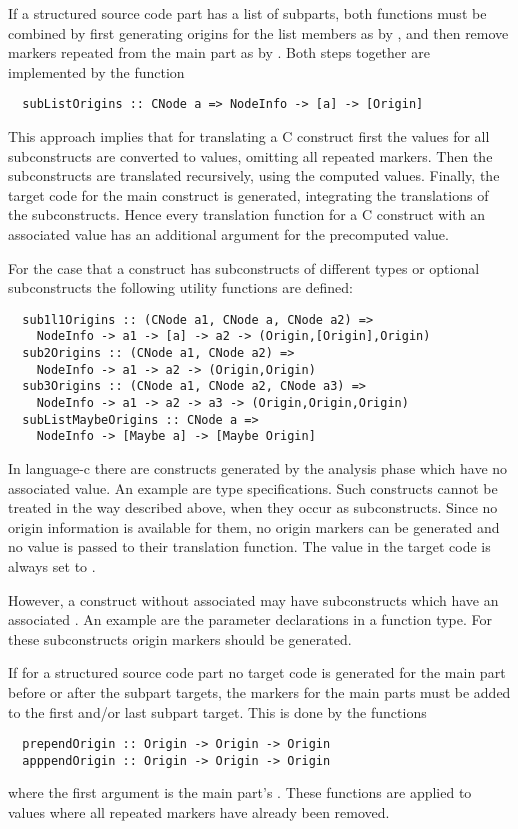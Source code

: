 If a structured source code part has a list of subparts, both functions must be combined by first generating origins 
for the list members as by , and then remove markers repeated from the main part as by .
Both steps together are implemented by the function
\begin{verbatim}
  subListOrigins :: CNode a => NodeInfo -> [a] -> [Origin]
\end{verbatim}

This approach implies that for translating a C construct first the  values for all subconstructs are 
converted to  values, omitting all repeated markers. Then the subconstructs are translated recursively, using
the computed  values. Finally, the target code for the main construct is generated, integrating the translations
of the subconstructs. Hence every translation function for a C construct with an associated  value
has an additional argument for the precomputed  value.

For the case that a construct has subconstructs of different types or optional subconstructs the following utility 
functions are defined:
\begin{verbatim}
  sub1l1Origins :: (CNode a1, CNode a, CNode a2) => 
    NodeInfo -> a1 -> [a] -> a2 -> (Origin,[Origin],Origin)
  sub2Origins :: (CNode a1, CNode a2) => 
    NodeInfo -> a1 -> a2 -> (Origin,Origin)
  sub3Origins :: (CNode a1, CNode a2, CNode a3) => 
    NodeInfo -> a1 -> a2 -> a3 -> (Origin,Origin,Origin)
  subListMaybeOrigins :: CNode a => 
    NodeInfo -> [Maybe a] -> [Maybe Origin]
\end{verbatim}

In language-c there are constructs generated by the analysis phase which have no associated  value. An example
are type specifications. Such constructs cannot be treated in the way described above, when they occur as subconstructs.
Since no origin information is available for them, no origin markers can be generated and no  value is
passed to their translation function. The  value in the target code is always set to .

However, a construct without associated  may have subconstructs which have an associated .
An example are the parameter declarations in a function type. For these subconstructs origin markers should be generated.

If for a structured source code part no target code is generated for the main part before or after the subpart targets, the markers
for the main parts must be added to the first and/or last subpart target. This is done by the functions
\begin{verbatim}
  prependOrigin :: Origin -> Origin -> Origin
  apppendOrigin :: Origin -> Origin -> Origin
\end{verbatim}
where the first argument is the main part's . These functions are applied to  values where all repeated 
markers have already been removed.

